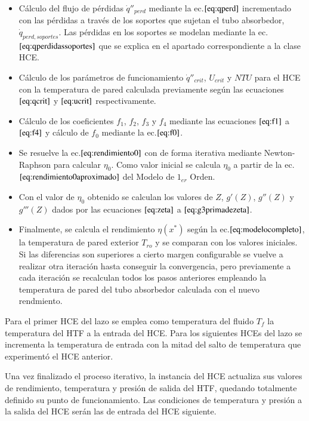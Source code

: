 \begin{itemize}
\item
  Cálculo del flujo de pérdidas \(\dot q''_{perd}\) mediante la   ec.\(\eqref{eq:qperd}\) incrementado con las pérdidas a través de los   soportes que sujetan el tubo absorbedor, \(\dot q_{perd,soportes}\).   Las pérdidas en los soportes se modelan mediante la   ec.\(\eqref{eq:qperdidassoportes}\) que se explica en el apartado   correspondiente a la clase HCE.
\item
  Cálculo de los parámetros de funcionamiento \(\dot q''_{crit}\),   \(U_{crit}\) y \(NTU\) para el HCE con la temperatura de pared   calculada previamente según las ecuaciones \(\eqref{eq:qcrit}\) y   \(\eqref{eq:ucrit}\) respectivamente.
\item
  Cálculo de los coeficientes \(f_1\), \(f_2\), \(f_3\) y \(f_4\)   mediante las ecuaciones \(\eqref{eq:f1}\) a \(\eqref{eq:f4}\) y   cálculo de \(f_0\) mediante la ec.\(\eqref{eq:f0}\).
\item
  Se resuelve la ec.\(\eqref{eq:rendimiento0}\) con de forma iterativa   mediante Newton-Raphson para calcular \(\eta_0\). Como valor inicial   se calcula \(\eta_0\) a partir de la   ec.\(\eqref{eq:rendimiento0aproximado}\) del Modelo de \(1_{er}\)  Orden.
\item
  Con el valor de \(\eta_0\) obtenido se calculan los valores de \(Z\),   \(g'(Z)\), \(g''(Z)\) y \(g'''(Z)\) dados por las ecuaciones   \(\eqref{eq:zeta}\) a \(\eqref{eq:g3primadezeta}\). 
\item
  Finalmente, se calcula el rendimiento \(\eta(x^*)\) según la   ec.\(\eqref{eq:modelocompleto}\), la temperatura de pared exterior   \(T_{ro}\) y se comparan con los valores iniciales. Si las diferencias   son superiores a cierto margen configurable se vuelve a realizar otra   iteración hasta conseguir la convergencia, pero previamente a cada   iteración se recalculan todos los pasos anteriores empleando la   temperatura de pared del tubo absorbedor calculada con el nuevo
  rendmiento. 
\end{itemize}

Para el primer HCE del lazo se emplea como temperatura del fluido \(T_f\) la temperatura del HTF a la entrada del HCE. Para los siguientes HCEs del lazo se incrementa la temperatura de entrada con la mitad del salto de temperatura que experimentó el HCE anterior.

Una vez finalizado el proceso iterativo, la instancia del HCE actualiza sus valores de rendimiento, temperatura y presión de salida del HTF, quedando totalmente definido su punto de funcionamiento. Las condiciones de temperatura y presión a la salida del HCE serán las de entrada del HCE siguiente.

